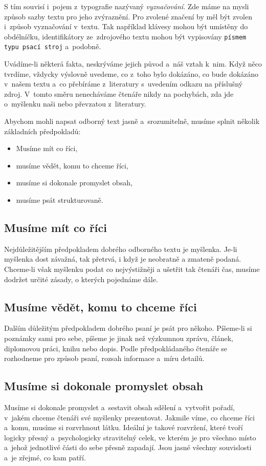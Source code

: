 S tím souvisí i~pojem z~typografie nazývaný {\it vyznačování}. Zde máme na mysli způsob sazby textu pro jeho zvýraznění. Pro zvolené značení by měl být zvolen i~způsob vyznačování v~textu. Tak například klávesy mohou být umístěny do obdélníčku, identifikátory ze~zdrojového textu mohou být vypisovány {\tt písmem typu psací stroj} a~podobně.

Uvádíme-li některá fakta, neskrýváme jejich původ a~náš vztah k~nim. Když něco tvrdíme, vždycky výslovně uvedeme, co z~toho bylo dokázáno, co bude dokázáno v~našem textu a~co přebíráme z~literatury s~uvedením odkazu na příslušný zdroj. V~tomto směru nenecháváme čtenáře nikdy na pochybách, zda jde o~myšlenku naši nebo převzatou z~literatury.

Abychom mohli napsat odborný text jasně a~srozumitelně, musíme splnit několik základních předpokladů:
\begin{itemize}
\item Musíme mít co říci,
\item musíme vědět, komu to chceme říci,
\item musíme si dokonale promyslet obsah,
\item musíme psát strukturovaně.
\end{itemize}

\subsection*{Musíme mít co říci}
Nejdůležitějším předpokladem dobrého odborného textu je myšlenka. Je-li myšlenka dost závažná, tak přetrvá, i když je neobratně a zmateně podaná. Chceme-li však myšlenku podat co nejvýstižněji a ušetřit tak čtenáři čas, musíme dodržet určité zásady, o kterých pojednáme dále.

\subsection*{Musíme vědět, komu to chceme říci}
Dalším důležitým předpokladem dobrého psaní je psát pro někoho. Píšeme-li si poznámky sami pro sebe, píšeme je jinak než výzkumnou zprávu, článek, diplomovou práci, knihu nebo dopis. Podle předpokládaného čtenáře se rozhodneme pro způsob psaní, rozsah informace a~míru detailů.

\subsection*{Musíme si dokonale promyslet obsah}
Musíme si dokonale promyslet a~sestavit obsah sdělení a~vytvořit pořadí, v~jakém chceme čtenáři své myšlenky prezentovat.
Jakmile víme, co chceme říci a~komu, musíme si rozvrhnout látku. Ideální je takové rozvržení, které tvoří logicky přesný a~psychologicky stravitelný celek, ve kterém je pro všechno místo a~jehož jednotlivé části do sebe přesně zapadají. Jsou jasné všechny souvislosti a~je zřejmé, co kam patří.

